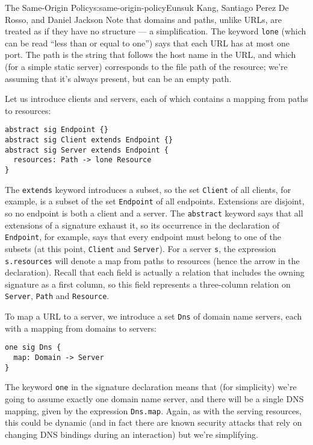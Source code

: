 \begin{aosachapter}{The Same-Origin Policy}{s:same-origin-policy}{Eunsuk Kang, Santiago Perez De Rosso, and Daniel Jackson}
Note that domains and paths, unlike URLs, are treated as if they have no
structure --- a simplification. The keyword \texttt{lone} (which can be
read ``less than or equal to one'') says that each URL has at most one
port. The path is the string that follows the host name in the URL, and
which (for a simple static server) corresponds to the file path of the
resource; we're assuming that it's always present, but can be an empty
path.

Let us introduce clients and servers, each of which contains a mapping
from paths to resources:

\begin{verbatim}
abstract sig Endpoint {}
abstract sig Client extends Endpoint {}
abstract sig Server extends Endpoint {
  resources: Path -> lone Resource
}
\end{verbatim}

The \texttt{extends} keyword introduces a subset, so the set
\texttt{Client} of all clients, for example, is a subset of the set
\texttt{Endpoint} of all endpoints. Extensions are disjoint, so no
endpoint is both a client and a server. The \texttt{abstract} keyword
says that all extensions of a signature exhaust it, so its occurrence in
the declaration of \texttt{Endpoint}, for example, says that every
endpoint must belong to one of the subsets (at this point,
\texttt{Client} and \texttt{Server}). For a server \texttt{s}, the
expression \texttt{s.resources} will denote a map from paths to
resources (hence the arrow in the declaration). Recall that each field
is actually a relation that includes the owning signature as a first
column, so this field represents a three-column relation on
\texttt{Server}, \texttt{Path} and \texttt{Resource}.

To map a URL to a server, we introduce a set \texttt{Dns} of domain name
servers, each with a mapping from domains to servers:

\begin{verbatim}
one sig Dns {
  map: Domain -> Server
}
\end{verbatim}

The keyword \texttt{one} in the signature declaration means that (for
simplicity) we're going to assume exactly one domain name server, and
there will be a single DNS mapping, given by the expression
\texttt{Dns.map}. Again, as with the serving resources, this could be
dynamic (and in fact there are known security attacks that rely on
changing DNS bindings during an interaction) but we're simplifying.


\end{aosachapter}
